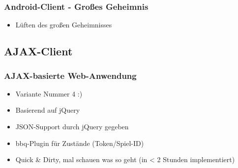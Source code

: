 \documentclass{beamer}
\begin{document}
\begin{frame}[fragile]
\frametitle{Android-Client - Großes Geheimnis}
\begin{itemize}
\item Lüften des großen Geheimnisses
\end{itemize}
\end{frame}

\subsection{AJAX-Client}

\begin{frame}[fragile]
\frametitle{AJAX-basierte Web-Anwendung}
\begin{itemize}
\item Variante Nummer 4 :)
\item Basierend auf jQuery
\item JSON-Support durch jQuery gegeben
\item bbq-Plugin für Zustände (Token/Spiel-ID)
\item Quick \& Dirty, mal schauen was so geht (in \textless{} 2 Stunden implementiert)
\end{itemize}
\end{frame}
\end{document}
